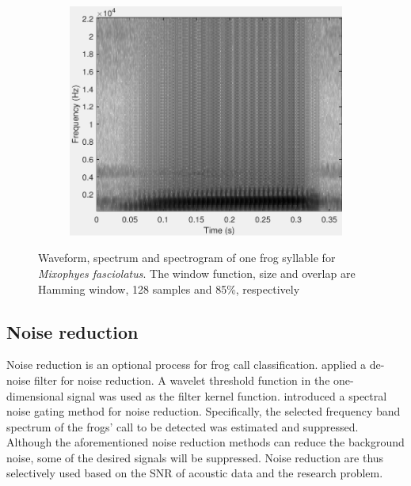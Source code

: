 \begin{figure}[htb!]
\begin{subfigure}[b]{0.32\textwidth}
           \includegraphics[width=1\textwidth,height=0.75\textwidth]{image/LR/spectrogram.pdf}
    \end{subfigure}%
\caption[Waveform, spectrum and spectrogram of one frog syllable]{Waveform, spectrum and spectrogram of one frog syllable for \textit{Mixophyes fasciolatus}. The window function, size and overlap are Hamming window, 128 samples and 85\%, respectively}
\label{fig:spectrogram}       %
\end{figure}





\subsection{Noise reduction}
Noise reduction is an optional process for frog call classification. 
\cite{Huang20141} applied a de-noise filter for noise reduction. A wavelet threshold function in the one-dimensional signal was used as the filter kernel function.
\cite{bedoya2014automatic} introduced a spectral noise gating method for noise reduction. Specifically, the selected frequency band spectrum of the frogs' call to be detected was estimated and suppressed. Although the aforementioned noise reduction methods can reduce the background noise, some of the desired signals will be suppressed. Noise reduction are thus selectively used based on the SNR of acoustic data and the research problem.




